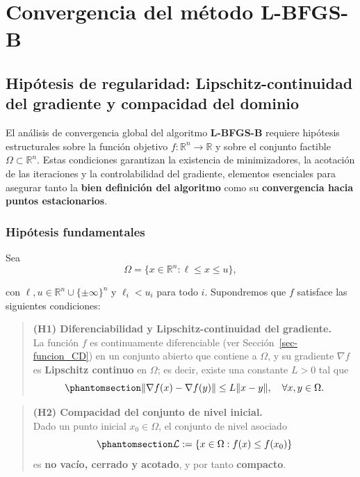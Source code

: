 \documentclass[
  spanish,
  us-letterpaper,
]{scrreprt}
\numberwithin{equation}{section}
\begin{document}
\section{Convergencia del método
L-BFGS-B}\label{convergencia-del-muxe9todo-l-bfgs-b}

\subsection{Hipótesis de regularidad: Lipschitz-continuidad del
gradiente y compacidad del
dominio}\label{hipuxf3tesis-de-regularidad-lipschitz-continuidad-del-gradiente-y-compacidad-del-dominio}

El análisis de convergencia global del algoritmo \textbf{L-BFGS-B}
requiere hipótesis estructurales sobre la función objetivo
\(f : \mathbb{R}^n \to \mathbb{R}\) y sobre el conjunto factible
\(\Omega \subset \mathbb{R}^n\). Estas condiciones garantizan la
existencia de minimizadores, la acotación de las iteraciones y la
controlabilidad del gradiente, elementos esenciales para asegurar tanto
la \textbf{bien definición del algoritmo} como su \textbf{convergencia
hacia puntos estacionarios}.

\subsubsection{Hipótesis
fundamentales}\label{hipuxf3tesis-fundamentales}

Sea \[
\Omega = \{ x \in \mathbb{R}^n : \ell \le x \le u \},
\]

con \(\ell, u \in \mathbb{R}^n \cup \{\pm\infty\}^n\) y \(\ell_i < u_i\)
para todo \(i\). Supondremos que \(f\) satisface las siguientes
condiciones:

\begin{quote}
\textbf{(H1) Diferenciabilidad y Lipschitz-continuidad del gradiente.}\\
La función \(f\) es continuamente diferenciable (ver
Sección~\ref{sec-funcion_CD}) en un conjunto abierto que contiene a
\(\Omega\), y su gradiente \(\nabla f\) es \textbf{Lipschitz continuo}
en \(\Omega\); es decir, existe una constante \(L > 0\) tal que\\
\begin{equation}\phantomsection\label{eq-37}{
\|\nabla f(x) - \nabla f(y)\| \le L \|x - y\|, \quad \forall x, y \in \Omega.
}\end{equation}
\end{quote}

\begin{quote}
\textbf{(H2) Compacidad del conjunto de nivel inicial.}\\
Dado un punto inicial \(x_0 \in \Omega\), el conjunto de nivel
asociado\\
\begin{equation}\phantomsection\label{eq-38}{
\mathcal{L} := \{ x \in \Omega : f(x) \le f(x_0) \} 
}\end{equation} es \textbf{no vacío, cerrado y acotado}, y por tanto
\textbf{compacto}.
\end{quote}
\end{document}
